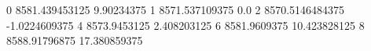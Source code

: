 0 8581.439453125 9.90234375
1 8571.537109375 0.0
2 8570.5146484375 -1.0224609375
4 8573.9453125 2.408203125
6 8581.9609375 10.423828125
8 8588.91796875 17.380859375
